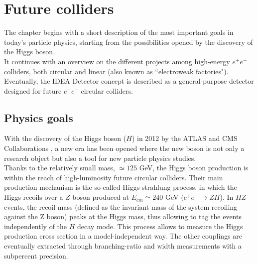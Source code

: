 \chapter{Future colliders}
The chapter begins with a short description of the most important goals in today's particle physics, starting from the possibilities opened by the discovery of the Higgs boson.\\
It continues with an overview on the different projects among high-energy $e^+e^-$ colliders, both circular and linear (also known as ``electroweak factories").\\
Eventually, the IDEA Detector concept is described as a general-purpose detector designed for future $e^+e^-$ circular colliders.

\section{Physics goals}
With the discovery of the Higgs boson ($H$) in 2012 by the ATLAS and CMS Collaborations \cite{ATLAS_H, CMS_H}, a new era has been opened where the new boson is not only a research object but also a tool for new particle physics studies.\\

Thanks to the relatively small mass, $\simeq 125$ GeV, the Higgs boson production is within the reach of high-luminosity future circular colliders. Their main production mechanism is the so-called Higgs-strahlung process, in which the Higgs recoils over a $Z$-boson produced at $E_{cm}\simeq 240$ GeV ($e^+ e^- \rightarrow Z H$).
In $HZ$ events, the recoil mass (defined as the invariant mass of the system recoiling against the Z boson) peaks at the Higgs mass, thus allowing to tag the events independently of the $H$ decay mode.
This process allows to measure the Higgs production cross section in a model-independent way. The other couplings are eventually extracted through branching-ratio and width measurements with a subpercent precision.


